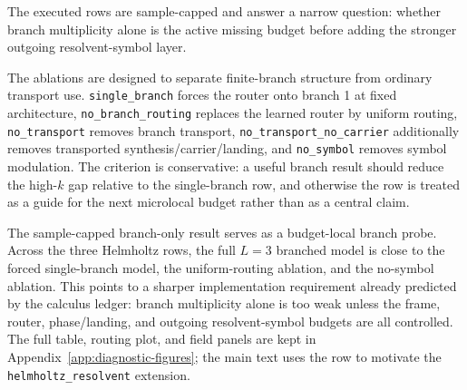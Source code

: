The executed rows are sample-capped and answer a narrow question: whether branch multiplicity alone is the active missing budget before adding the stronger outgoing resolvent-symbol layer.

The ablations are designed to separate finite-branch structure from ordinary transport use.  \texttt{single\_branch} forces the router onto branch 1 at fixed architecture, \texttt{no\_branch\_routing} replaces the learned router by uniform routing, \texttt{no\_transport} removes branch transport, \texttt{no\_transport\_no\_carrier} additionally removes transported synthesis/carrier/landing, and \texttt{no\_symbol} removes symbol modulation.  The criterion is conservative: a useful branch result should reduce the high-$k$ gap relative to the single-branch row, and otherwise the row is treated as a guide for the next microlocal budget rather than as a central claim.

The sample-capped branch-only result serves as a budget-local branch probe.  Across the three Helmholtz rows, the full $L=3$ branched model is close to the forced single-branch model, the uniform-routing ablation, and the no-symbol ablation.  This points to a sharper implementation requirement already predicted by the calculus ledger: branch multiplicity alone is too weak unless the frame, router, phase/landing, and outgoing resolvent-symbol budgets are all controlled.  The full table, routing plot, and field panels are kept in Appendix~\ref{app:diagnostic-figures}; the main text uses the row to motivate the \texttt{helmholtz\_resolvent} extension.

